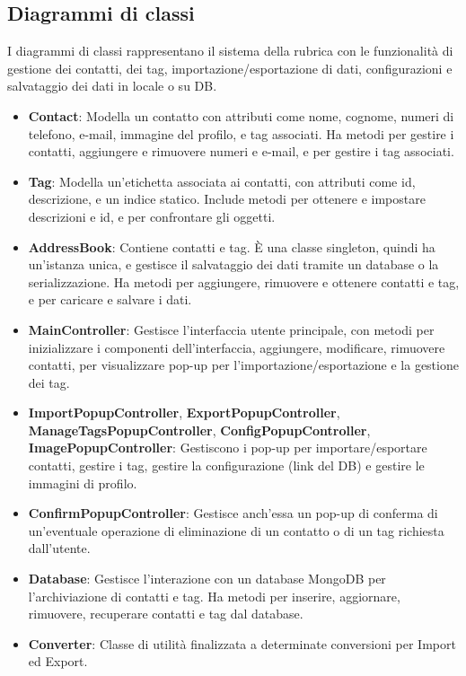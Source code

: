 \subsection{Diagrammi di classi}
I diagrammi di classi rappresentano il sistema della rubrica con le funzionalità di gestione dei contatti, dei tag, importazione/esportazione di dati, configurazioni e salvataggio dei dati in locale o su DB.
\begin{itemize}[noitemsep, topsep=5pt]
	\item \textbf{Contact}: Modella un contatto con attributi come nome, cognome, numeri di telefono, e-mail, immagine del profilo, e tag associati. Ha metodi per gestire i contatti, aggiungere e rimuovere numeri e e-mail, e per gestire i tag associati.
	\item \textbf{Tag}: Modella un'etichetta associata ai contatti, con attributi come id, descrizione, e un indice statico. Include metodi per ottenere e impostare descrizioni e id, e per confrontare gli oggetti.
	\item \textbf{AddressBook}: Contiene contatti e tag. È una classe singleton, quindi ha un'istanza unica, e gestisce il salvataggio dei dati tramite un database o la serializzazione. Ha metodi per aggiungere, rimuovere e ottenere contatti e tag, e per caricare e salvare i dati.
	\item \textbf{MainController}: Gestisce l'interfaccia utente principale, con metodi per inizializzare i componenti dell'interfaccia, aggiungere, modificare, rimuovere contatti, per visualizzare pop-up per l'importazione/esportazione e la gestione dei tag.
	\item \textbf{ImportPopupController}, \textbf{ExportPopupController}, \textbf{ManageTagsPopupController}, \textbf{ConfigPopupController}, \textbf{ImagePopupController}: Gestiscono i pop-up per importare/esportare contatti, gestire i tag, gestire la configurazione (link del DB) e gestire le immagini di profilo.
	\item \textbf{ConfirmPopupController}: Gestisce anch'essa un pop-up di conferma di un'eventuale operazione di eliminazione di un contatto o di un tag richiesta dall'utente.
	\item \textbf{Database}: Gestisce l'interazione con un database MongoDB per l'archiviazione di contatti e tag. Ha metodi per inserire, aggiornare, rimuovere, recuperare contatti e tag dal database.
	\item \textbf{Converter}: Classe di utilità finalizzata a determinate conversioni per Import ed Export.
\end{itemize}


